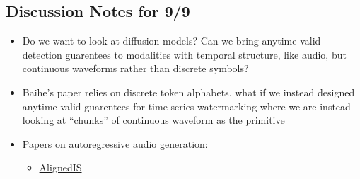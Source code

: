 \documentclass[12pt]{article}
\theoremstyle{plain}
\theoremstyle{definition}
\begin{document}
\subsection{Discussion Notes for 9/9}
\begin{itemize}
    \item Do we want to look at diffusion models? Can we bring anytime valid detection guarentees to modalities with temporal structure, like audio, but continuous waveforms rather than discrete symbols?
    \item Baihe's paper relies on discrete token alphabets. what if we instead designed anytime-valid guarentees for time series watermarking where we are instead looking at   ``chunks'' of continuous waveform as the primitive
    \item Papers on autoregressive audio generation:
    \begin{itemize}
        \item \href{https://arxiv.org/html/2510.21115v1}{AlignedIS}
    \end{itemize}
\end{itemize}
\end{document}
